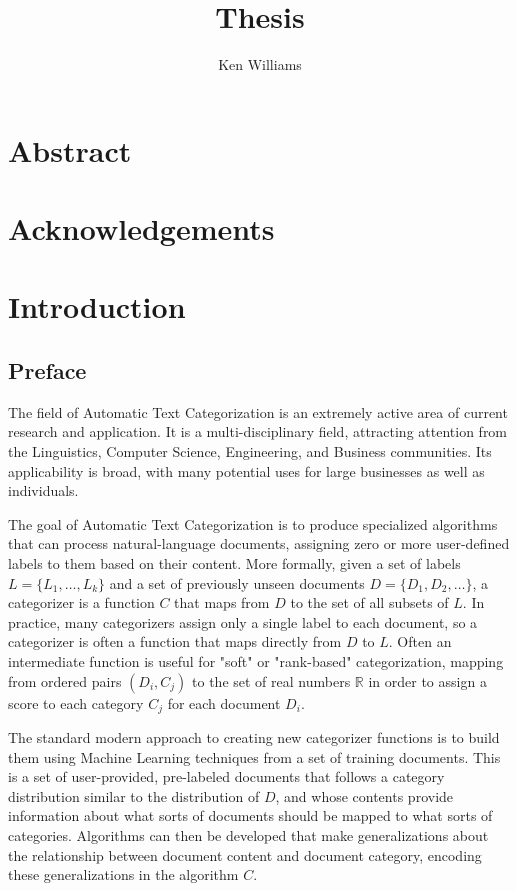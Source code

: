 \documentclass[a4paper]{report}
\title{Thesis}
\author{Ken Williams}
\begin{document}
\maketitle

\chapter*{Abstract}
\chapter*{Acknowledgements}

\tableofcontents

\chapter{Introduction}

\section{Preface}

The field of Automatic Text Categorization is an extremely active area
of current research and application.  It is a multi-disciplinary
field, attracting attention from the Linguistics, Computer Science,
Engineering, and Business communities.  Its applicability is broad,
with many potential uses for large businesses as well as individuals.

The goal of Automatic Text Categorization is to produce specialized
algorithms that can process natural-language documents, assigning zero
or more user-defined labels to them based on their content.  More
formally, given a set of labels $L = \{L_1, \ldots, L_k\}$ and a set of
previously unseen documents $D = \{D_1, D_2, \ldots \}$, a categorizer is a
function $C$ that maps from $D$ to the set of all subsets of $L$.  In
practice, many categorizers assign only a single label to each
document, so a categorizer is often a function that maps directly from
$D$ to $L$.  Often an intermediate function is useful for "soft" or 
"rank-based" categorization, mapping from ordered pairs $(D_i, C_j)$ 
to the set of real numbers $\mathbb{R}$ in order to assign a score 
to each category $C_j$ for each document $D_i$.

The standard modern approach to creating new categorizer functions is
to build them using Machine Learning techniques from a set of training
documents.  This is a set of user-provided, pre-labeled documents that
follows a category
distribution similar to the distribution of $D$, and whose contents
provide information about what sorts of documents should be mapped to
what sorts of categories.  Algorithms can then be developed that make
generalizations about the relationship between document content and
document category, encoding these generalizations in the algorithm $C$.
\end{document}
